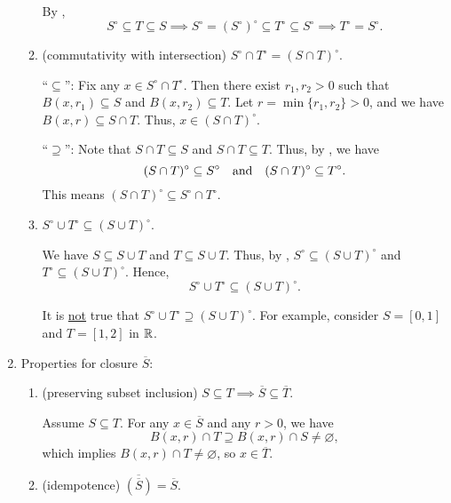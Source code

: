 \begin{enumerate}
\begin{enumerate}
\begin{pf}
By ,
\[
S^{\circ}\subseteq T\subseteq S\implies 
S^{\circ}=(S^{\circ})^{\circ}\subseteq T^{\circ}\subseteq S^{\circ}
\implies T^{\circ}=S^{\circ}.
\]
\end{pf}
\item (commutativity with intersection) \(S^{\circ}\cap T^{\circ}=(S\cap
T)^{\circ}\).

\begin{pf}
``\(\subseteq\)'': Fix any \(x\in S^{\circ}\cap T^{\circ}\). Then there exist
\(r_1,r_2>0\) such that \(B(x,r_1)\subseteq S\) and \(B(x,r_2)\subseteq T\).
Let \(r=\min\{r_1,r_2\}>0\), and we have \(B(x,r)\subseteq S\cap T\). Thus,
\(x\in(S\cap T)^{\circ}\).

``\(\supseteq\)'': Note that \(S\cap T\subseteq S\) and \(S\cap T\subseteq T\).
Thus, by , we have
\[
(S\cap T)^{\circ}\subseteq S^{\circ}\qqtext{and}
(S\cap T)^{\circ}\subseteq T^{\circ}.
\]
This means \((S\cap T)^{\circ}\subseteq S^{\circ}\cap T^{\circ}\).
\end{pf}
\item \(S^{\circ}\cup T^{\circ}\subseteq (S\cup T)^{\circ}\).

\begin{pf}
We have \(S\subseteq S\cup T\) and \(T\subseteq S\cup T\).
Thus, by , \(S^{\circ}\subseteq
(S\cup T)^{\circ}\) and \(T^{\circ}\subseteq (S\cup T)^{\circ}\). Hence,
\[
S^{\circ}\cup T^{\circ}\subseteq (S\cup T)^{\circ}.
\]
\end{pf}

\begin{warning}
It is \underline{not} true that \(S^{\circ}\cup T^{\circ}\supseteq (S\cup
T)^{\circ}\). For example, consider \(S=[0,1]\) and \(T=[1,2]\) in \(\mathbb{R}\).
\end{warning}
\end{enumerate}

\item \label{it:clos-set-prop}
Properties for closure \(\overline{S}\):
\begin{enumerate}
\item \label{it:clos-pre-subset} (preserving subset inclusion) \(S\subseteq
T\implies \overline{S}\subseteq \overline{T}\).

\begin{pf}
Assume \(S\subseteq T\).  For any \(x\in\overline{S}\) and any \(r>0\), we have
\[
B(x,r)\cap T\supseteq B(x,r)\cap S\ne\varnothing,
\]
which implies \(B(x,r)\cap T\ne\varnothing\), so \(x\in \overline{T}\).
\end{pf}
\item \label{it:clos-idempot} (idempotence) \(\overline{(\overline{S})}=\overline{S}\).


\end{enumerate}
\end{enumerate}
